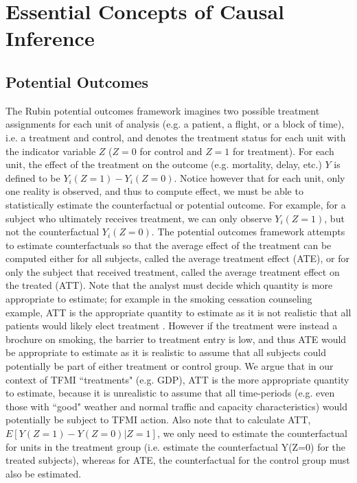 \documentclass[conference]{IEEEtran}
\begin{document}
\section{Essential Concepts of Causal Inference}
\subsection{Potential Outcomes}
The Rubin potential outcomes framework \cite{rubin1974estimating} imagines two possible treatment assignments for each unit of analysis (e.g. a patient, a flight, or a block of time), i.e. a treatment and control, and denotes the treatment status for each unit with the indicator variable $Z$ ($Z=0$ for control and $Z=1$ for treatment).  For each unit, the effect of the treatment on the outcome (e.g. mortality, delay, etc.) $Y$ is defined to be $Y_i(Z=1) - Y_i(Z=0)$.  Notice however that for each unit, only one reality is observed, and thus to compute effect, we must be able to statistically estimate the counterfactual or potential outcome.  For example, for a subject who ultimately receives treatment, we can only observe $Y_i(Z=1)$, but not the counterfactual $Y_i(Z=0)$.  The potential outcomes framework attempts to estimate counterfactuals so that the average effect of the treatment can be computed either for all subjects, called the average treatment effect (ATE),  or for only the subject that received treatment, called the average treatment effect on the treated (ATT).  Note that the analyst must decide which quantity is more appropriate to estimate; for example in the smoking cessation counseling example, ATT is the appropriate quantity to estimate as it is not realistic that all patients would likely elect treatment \cite{austin2011tutorial}.  However if the treatment were instead a brochure on smoking, the barrier to treatment entry is low, and thus ATE would be appropriate to estimate as it is realistic to assume that all subjects could potentially be part of either treatment or control group.  We argue  that in our context of TFMI ``treatments" (e.g. GDP), ATT is the more appropriate quantity to estimate, because it is unrealistic to assume that all time-periods (e.g. even those with ``good" weather and normal traffic and capacity characteristics) would potentially be subject to TFMI action.  Also note that to calculate ATT, $E[Y(Z=1) - Y(Z=0)| Z=1]$, we only need to estimate the counterfactual for units in the treatment group (i.e. estimate the counterfactual Y(Z=0) for the treated subjects), whereas for ATE, the counterfactual for the control group must also be estimated.  
\end{document}
